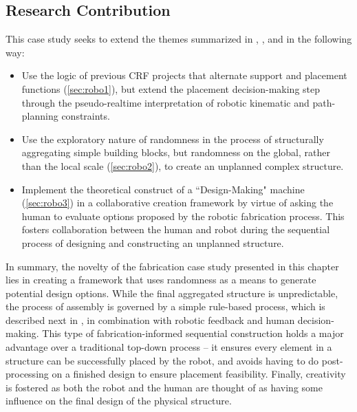     \subsection{Research Contribution}
        This case study seeks to extend the themes summarized in , , and  in the following way:
        
        \begin{itemize}
            \item Use the logic of previous CRF projects that alternate support and placement functions (\cref{sec:robo1}), but extend the placement decision-making step through the pseudo-realtime interpretation of robotic kinematic and path-planning constraints.
            \item Use the exploratory nature of randomness in the process of structurally aggregating simple building blocks, but randomness on the global, rather than the local scale (\cref{sec:robo2}), to create an unplanned complex structure.
            \item Implement the theoretical construct of a ``Design-Making" machine (\cref{sec:robo3}) in a collaborative creation framework by virtue of asking the human to evaluate options proposed by the robotic fabrication process. This fosters collaboration between the human and robot during the sequential process of designing and constructing an unplanned structure. 
        \end{itemize}
        
        In summary, the novelty of the fabrication case study presented in this chapter lies in creating a framework that uses randomness as a means to generate potential design options. While the final aggregated structure is unpredictable, the process of assembly is governed by a simple rule-based process, which is described next in , in combination with robotic feedback and human decision-making. This type of fabrication-informed sequential construction holds a major advantage over a traditional top-down process -- it ensures every element in a structure can be successfully placed by the robot, and avoids having to do post-processing on a finished design to ensure placement feasibility. Finally, creativity is fostered as both the robot and the human are thought of as having some influence on the final design of the physical structure.
            
  
